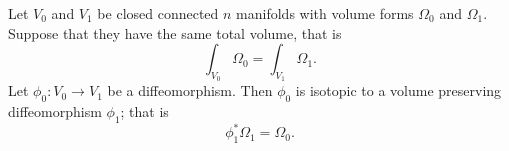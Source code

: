 

    Let $V_0$ and $V_1$ be closed connected $n$ manifolds with volume forms $\Omega_0$ and $\Omega_1$.
     Suppose that they have the same total volume,  that is 
    \[\int_{V_0} \Omega_0 = \int_{V_1} \Omega_1.\]
    Let $\phi_0: V_0\to V_1$ be a diffeomorphism.
    Then $\phi_0$ is isotopic to a volume preserving diffeomorphism $\phi_1$; that is
    \[\phi_1^*\Omega_1=\Omega_0.\]

